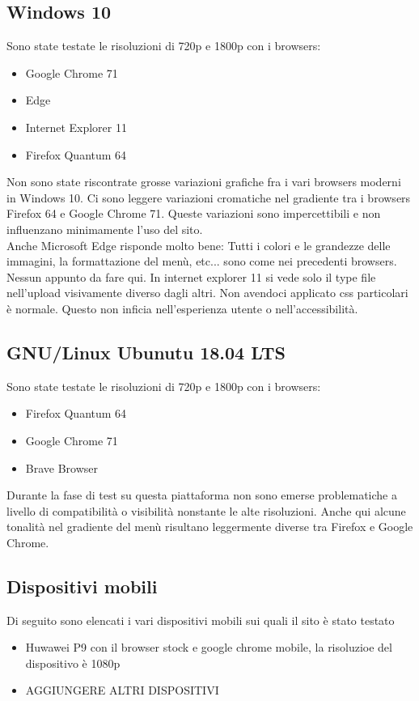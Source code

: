 \documentclass[openany, a4paper, 12pt]{report}
\begin{document}
				\subsection{Windows 10}
				Sono state testate le risoluzioni di 720p e 1800p con i browsers:
				\begin{itemize}
					\item Google Chrome 71
					\item Edge
					\item Internet Explorer 11
					\item Firefox Quantum 64
				\end{itemize}
				Non sono state riscontrate grosse variazioni grafiche fra i vari browsers moderni in Windows 10. Ci sono leggere variazioni cromatiche nel gradiente tra i browsers Firefox 64 e Google Chrome 71. Queste variazioni sono impercettibili e non influenzano minimamente l'uso del sito.\\
				Anche Microsoft Edge risponde molto bene: Tutti i colori e le grandezze delle immagini, la formattazione del menù, etc... sono come nei precedenti browsers. Nessun appunto da fare qui.
				In internet explorer 11 si vede solo il type file nell'upload visivamente diverso dagli altri. Non avendoci applicato css particolari è normale. Questo non inficia nell'esperienza utente o nell'accessibilità.
				
				\subsection{GNU/Linux Ubunutu 18.04 LTS}
				Sono state testate le risoluzioni di 720p e 1800p con i browsers:
				\begin{itemize}
					\item Firefox Quantum 64
					\item Google Chrome 71
					\item Brave Browser
				\end{itemize}
				Durante la fase di test su questa piattaforma non sono emerse problematiche a livello di compatibilità o visibilità nonstante le alte risoluzioni. Anche qui alcune tonalità nel gradiente del menù risultano leggermente diverse tra Firefox e Google Chrome.

				\subsection{Dispositivi mobili}
				Di seguito sono elencati i vari dispositivi mobili sui quali il sito è stato testato
				\begin{itemize}
				\item Huwawei P9 con il browser stock e google chrome mobile, la risoluzioe del dispositivo è 1080p 
				\item AGGIUNGERE ALTRI DISPOSITIVI 
				\end{itemize}
			
\end{document}
